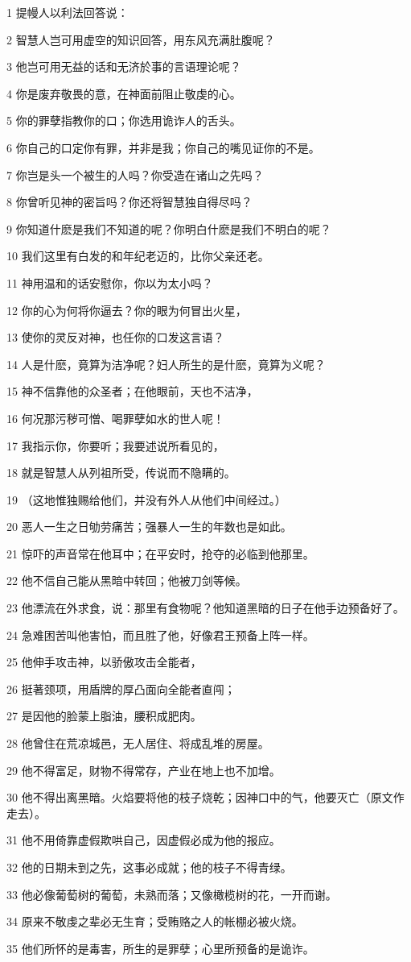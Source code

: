 \par 1 提幔人以利法回答说：
\par 2 智慧人岂可用虚空的知识回答，用东风充满肚腹呢？
\par 3 他岂可用无益的话和无济於事的言语理论呢？
\par 4 你是废弃敬畏的意，在神面前阻止敬虔的心。
\par 5 你的罪孽指教你的口；你选用诡诈人的舌头。
\par 6 你自己的口定你有罪，并非是我；你自己的嘴见证你的不是。
\par 7 你岂是头一个被生的人吗？你受造在诸山之先吗？
\par 8 你曾听见神的密旨吗？你还将智慧独自得尽吗？
\par 9 你知道什麽是我们不知道的呢？你明白什麽是我们不明白的呢？
\par 10 我们这里有白发的和年纪老迈的，比你父亲还老。
\par 11 神用温和的话安慰你，你以为太小吗？
\par 12 你的心为何将你逼去？你的眼为何冒出火星，
\par 13 使你的灵反对神，也任你的口发这言语？
\par 14 人是什麽，竟算为洁净呢？妇人所生的是什麽，竟算为义呢？
\par 15 神不信靠他的众圣者；在他眼前，天也不洁净，
\par 16 何况那污秽可憎、喝罪孽如水的世人呢！
\par 17 我指示你，你要听；我要述说所看见的，
\par 18 就是智慧人从列祖所受，传说而不隐瞒的。
\par 19 （这地惟独赐给他们，并没有外人从他们中间经过。）
\par 20 恶人一生之日劬劳痛苦；强暴人一生的年数也是如此。
\par 21 惊吓的声音常在他耳中；在平安时，抢夺的必临到他那里。
\par 22 他不信自己能从黑暗中转回；他被刀剑等候。
\par 23 他漂流在外求食，说：那里有食物呢？他知道黑暗的日子在他手边预备好了。
\par 24 急难困苦叫他害怕，而且胜了他，好像君王预备上阵一样。
\par 25 他伸手攻击神，以骄傲攻击全能者，
\par 26 挺著颈项，用盾牌的厚凸面向全能者直闯；
\par 27 是因他的脸蒙上脂油，腰积成肥肉。
\par 28 他曾住在荒凉城邑，无人居住、将成乱堆的房屋。
\par 29 他不得富足，财物不得常存，产业在地上也不加增。
\par 30 他不得出离黑暗。火焰要将他的枝子烧乾；因神口中的气，他要灭亡（原文作走去）。
\par 31 他不用倚靠虚假欺哄自己，因虚假必成为他的报应。
\par 32 他的日期未到之先，这事必成就；他的枝子不得青绿。
\par 33 他必像葡萄树的葡萄，未熟而落；又像橄榄树的花，一开而谢。
\par 34 原来不敬虔之辈必无生育；受贿赂之人的帐棚必被火烧。
\par 35 他们所怀的是毒害，所生的是罪孽；心里所预备的是诡诈。

